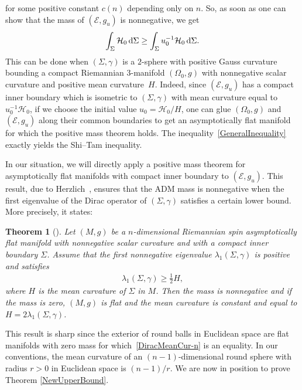 \documentclass[10pt,a4paper]{amsart}
\numberwithin{equation}{section}
\newtheorem{Theorem}{Theorem}[section]
\begin{document}
for some positive constant $c(n)$ depending only on $n$. So, as soon as one can show that the mass of $(\mathcal{E},g_u)$ is nonnegative, we get
\begin{gather}\label{GeneralInequality}
\int_\Sigma \mathcal{H}_0\,{\rm d}\Sigma\geq \int_\Sigma u^{-1}_0\mathcal{H}_0\,{\rm d}\Sigma.
\end{gather}
This can be done when $(\Sigma,\gamma)$ is a $2$-sphere with positive Gauss curvature bounding a compact Riemannian $3$-manifold $(\Omega_0,g)$ with nonnegative scalar curvature and positive mean curvature~$H$. Indeed, since $(\mathcal{E},g_u)$ has a compact inner boundary which is isometric to $(\Sigma,\gamma)$ with mean curvature equal to $u_0^{-1}\mathcal{H}_0$, if we choose the initial value $u_0=\mathcal{H}_0/H$, one can glue $(\Omega_0,g)$ and $(\mathcal{E},g_u)$ along their common boundaries to get an asymptotically flat manifold for which the positive mass theorem holds. The inequality~\eqref{GeneralInequality} exactly yields the Shi--Tam inequality.

In our situation, we will directly apply a positive mass theorem for asymptotically flat manifolds with compact inner boundary to $(\mathcal{E},g_u)$. This result, due to Herzlich~\cite{Herzlich1,Herzlich2}, ensures that the ADM mass is nonnegative when the first eigenvalue of the Dirac operator of $(\Sigma,\gamma)$ satisfies a certain lower bound. More precisely, it states:
\begin{Theorem}[\cite{Herzlich1,Herzlich2}]\label{HerzlichPMT-n}
Let $(M,g)$ be a $n$-dimensional Riemannian spin asymptotically flat manifold with nonnegative scalar curvature and with a compact inner boundary $\Sigma$. Assume that the first nonnegative eigenvalue $\lambda_1(\Sigma,\gamma)$ is positive and satisfies
\begin{gather}\label{DiracMeanCur-n}
\lambda_1(\Sigma,\gamma)\geq\frac{1}{2}H,
\end{gather}
where $H$ is the mean curvature of $\Sigma$ in $M$. Then the mass is nonnegative and if the mass is zero, $(M,g)$ is flat and the mean curvature is constant and equal to $H=2\lambda_1(\Sigma,\gamma)$.
\end{Theorem}
This result is sharp since the exterior of round balls in Euclidean space are flat manifolds with zero mass for which~\eqref{DiracMeanCur-n} is an equality. In our conventions, the mean curvature of an $(n-1)$-dimensional round sphere with radius $r>0$ in Euclidean space is $(n-1)/r$. We are now in position to prove Theorem \ref{NewUpperBound}.
\end{document}
